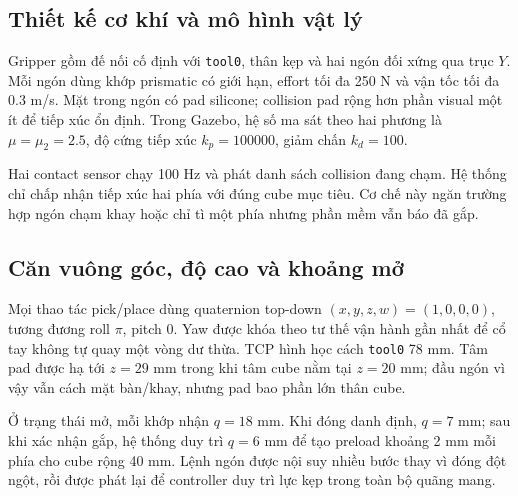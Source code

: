 \documentclass[a4paper,12pt]{article}
\newcommand{\code}[1]{\texttt{#1}}
\begin{document}
\subsection{Thiết kế cơ khí và mô hình vật lý}
Gripper gồm đế nối cố định với \code{tool0}, thân kẹp và hai ngón đối xứng qua
trục $Y$. Mỗi ngón dùng khớp prismatic có giới hạn, effort tối đa 250 N và vận
tốc tối đa 0.3 m/s. Mặt trong ngón có pad silicone; collision pad rộng hơn phần
visual một ít để tiếp xúc ổn định. Trong Gazebo, hệ số ma sát theo hai phương là
$\mu=\mu_2=2.5$, độ cứng tiếp xúc $k_p=100000$, giảm chấn $k_d=100$.

Hai contact sensor chạy 100 Hz và phát danh sách collision đang chạm. Hệ thống
chỉ chấp nhận tiếp xúc hai phía với đúng cube mục tiêu. Cơ chế này ngăn trường
hợp ngón chạm khay hoặc chỉ tì một phía nhưng phần mềm vẫn báo đã gắp.

\subsection{Căn vuông góc, độ cao và khoảng mở}
Mọi thao tác pick/place dùng quaternion top-down $(x,y,z,w)=(1,0,0,0)$, tương
đương roll $\pi$, pitch $0$. Yaw được khóa theo tư thế vận hành gần nhất để cổ
tay không tự quay một vòng dư thừa. TCP hình học cách \code{tool0} 78 mm. Tâm
pad được hạ tới $z=29$ mm trong khi tâm cube nằm tại $z=20$ mm; đầu ngón vì vậy
vẫn cách mặt bàn/khay, nhưng pad bao phần lớn thân cube.

Ở trạng thái mở, mỗi khớp nhận $q=18$ mm. Khi đóng danh định, $q=7$ mm; sau khi
xác nhận gắp, hệ thống duy trì $q=6$ mm để tạo preload khoảng 2 mm mỗi phía cho
cube rộng 40 mm. Lệnh ngón được nội suy nhiều bước thay vì đóng đột ngột, rồi
được phát lại để controller duy trì lực kẹp trong toàn bộ quãng mang.
\end{document}
